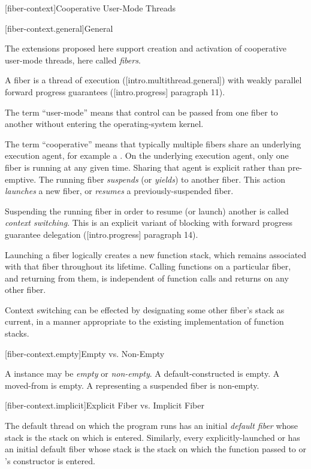 \newpage

\setcounter{section}{33}
\setcounter{subsection}{10}

\label{api}

[fiber-context]{Cooperative User-Mode Threads}

[fiber-context.general]{General}

The extensions proposed here support creation and activation of cooperative
user-mode threads, here called \emph{fibers}.

A fiber is a thread of execution ([intro.multithread.general]) with
weakly parallel forward progress guarantees ([intro.progress] paragraph 11).

The term ``user-mode'' means that control can be passed from one fiber to
another without entering the operating-system kernel.

The term ``cooperative'' means that typically multiple fibers share an
underlying execution agent, for example a . On the
underlying execution agent, only one fiber is running at any given time. Sharing
that agent is explicit rather than pre-emptive. The running
fiber \emph{suspends} (or \emph{yields}) to another fiber. This
action \emph{launches} a new fiber, or \emph{resumes} a previously-suspended
fiber.

Suspending the running fiber in order to resume (or launch) another is
called \emph{context switching}. This is an explicit variant of blocking with
forward progress guarantee delegation ([intro.progress] paragraph 14).

Launching a fiber logically creates a new function stack, which remains
associated with that fiber throughout its lifetime. Calling functions on a
particular fiber, and returning from them, is independent of function calls
and returns on any other fiber.

Context switching can be effected by designating some other fiber's stack as
current, in a manner appropriate to the existing implementation of function stacks.

[fiber-context.empty]{Empty vs. Non-Empty}

A \fiber instance may be \emph{empty} or \emph{non-empty}. A
default-constructed \fiber is empty. A moved-from \fiber is empty. A \fiber
representing a suspended fiber is non-empty.

[fiber-context.implicit]{Explicit Fiber vs. Implicit Fiber}

The default thread on which the program runs \main has an
initial \emph{default fiber} whose stack is the stack on which \main is
entered.  Similarly, every explicitly-launched
 or  has an initial default fiber whose
stack is the stack on which the function passed to  or
's constructor is entered.

